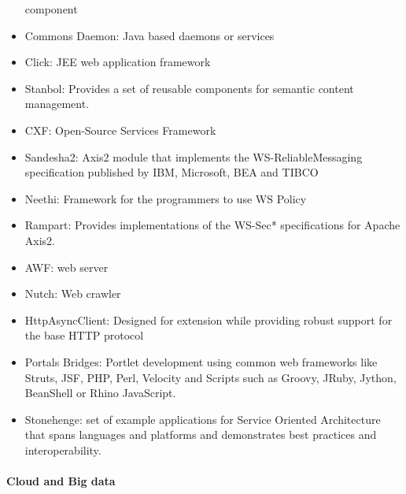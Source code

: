 \documentclass[natbib]{svjour3}
\let\oldparagraph\paragraph
\renewcommand{\paragraph}[1]{\oldparagraph{#1}\mbox{}}
\begin{document}
\begin{itemize}
  component
\item
  Commons Daemon: Java based daemons or services
\item
  Click: JEE web application framework
\item
  Stanbol: Provides a set of reusable components for semantic content
  management.
\item
  CXF: Open-Source Services Framework
\item
  Sandesha2: Axis2 module that implements the WS-ReliableMessaging
  specification published by IBM, Microsoft, BEA and TIBCO
\item
  Neethi: Framework for the programmers to use WS Policy
\item
  Rampart: Provides implementations of the WS-Sec* specifications for
  Apache Axis2.
\item
  AWF: web server
\item
  Nutch: Web crawler
\item
  HttpAsyncClient: Designed for extension while providing robust support
  for the base HTTP protocol
\item
  Portals Bridges: Portlet development using common web frameworks like
  Struts, JSF, PHP, Perl, Velocity and Scripts such as Groovy, JRuby,
  Jython, BeanShell or Rhino JavaScript.
\item
  Stonehenge: set of example applications for Service Oriented
  Architecture that spans languages and platforms and demonstrates best
  practices and interoperability.
\end{itemize}

\paragraph{Cloud and Big data}\label{cloud-and-big-data}
\end{document}
